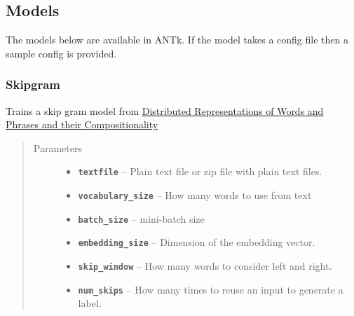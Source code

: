\documentclass[letterpaper,10pt,english]{sphinxmanual}
\begin{document}
\subsection{Models}
\label{models:models}\label{models::doc}\label{models:distributed-representations-of-words-and-phrases-and-their-compositionality}
The models below are available in ANTk. If the model takes a config file then a sample config is provided.


\subsubsection{Skipgram}
\label{models:skipgram}\label{models:module-skipgram}

\begin{fulllineitems}
\label{models:skipgram.SkipGramVecs}
Trains a skip gram model from \href{http://papers.nips.cc/paper/5021-distributed-representations-of-words-and-phrases-and-their-compositionality.pdf}{Distributed Representations of Words and Phrases and their Compositionality}
\begin{quote}\begin{description}
\item[{Parameters}] \leavevmode\begin{itemize}
\item {} 
\textbf{\texttt{textfile}} -- Plain text file or zip file with plain text files.

\item {} 
\textbf{\texttt{vocabulary\_size}} -- How many words to use from text

\item {} 
\textbf{\texttt{batch\_size}} -- mini-batch size

\item {} 
\textbf{\texttt{embedding\_size}} -- Dimension of the embedding vector.

\item {} 
\textbf{\texttt{skip\_window}} -- How many words to consider left and right.

\item {} 
\textbf{\texttt{num\_skips}} -- How many times to reuse an input to generate a label.


\end{itemize}
\end{description}
\end{quote}
\end{fulllineitems}
\end{document}
